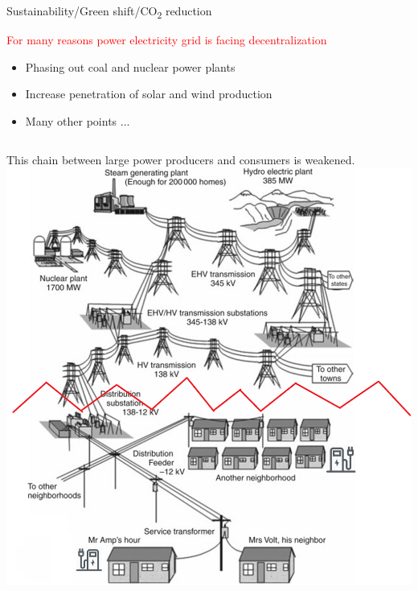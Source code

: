 \documentclass{beamer}
\begin{document}

\begin{frame}{Sustainability/Green shift/CO\textsubscript{2} reduction}
\begin{alertblock}{\textcolor{red}{For many reasons power electricity grid is facing decentralization}}
\begin{itemize}
\item Phasing out coal and nuclear power plants
\item Increase penetration of solar and wind production
\item Many other points ...
\end{itemize}
\end{alertblock}
\begin{columns}
    This chain between large power producers and consumers is weakened.
\includegraphics[width=2 in , height=1.6 in]{Figures/EVchalendgebreak.png}
\end{columns}
\end{frame}

\end{document}
